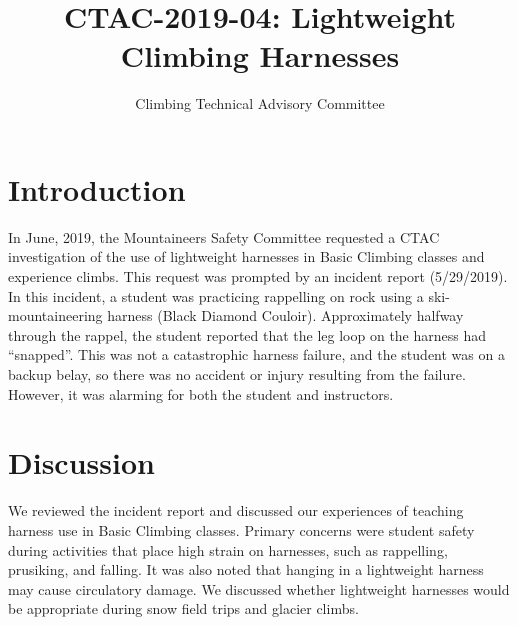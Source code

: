\documentclass[nonacm,acmtog,authordraft]{acmart}
\title{CTAC-2019-04: Lightweight Climbing Harnesses}
\subtitle{Climbing Technical Advisory Committee}
\begin{document}
\maketitle


\section{Introduction}
\label{sec:intro}
  
  In June, 2019, the Mountaineers Safety Committee requested a CTAC
  investigation of the use of lightweight harnesses in Basic Climbing classes
  and experience climbs. This request was prompted by an incident report
  (5/29/2019). In this incident, a student was practicing rappelling on rock
  using a ski-mountaineering harness (Black Diamond Couloir). Approximately
  halfway through the rappel, the student reported that the leg loop on the
  harness had ``snapped''. This was not a catastrophic harness failure, and the
  student was on a backup belay, so there was no accident or injury resulting
  from the failure. However, it was alarming for both the student and
  instructors.


\section{Discussion}
\label{sec:discuss}
  
  We reviewed the incident report and discussed our experiences of teaching
  harness use in Basic Climbing classes. Primary concerns were student safety
  during activities that place high strain on harnesses, such as rappelling,
  prusiking, and falling. It was also noted that hanging in a lightweight
  harness may cause circulatory damage. We discussed whether lightweight
  harnesses would be appropriate during snow field trips and glacier climbs.

\end{document}
